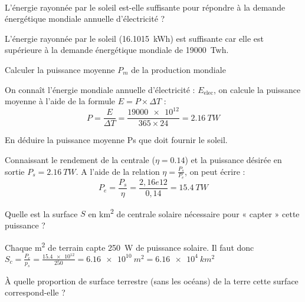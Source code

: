 \documentclass[10pt,fleqn]{article} %
\begin{document}
\begin{exercise}
~
    \begin{question}
        L’énergie rayonnée par le soleil est-elle suffisante pour répondre à la demande énergétique mondiale annuelle d'électricité ?
    \end{question}
    
    \begin{solution}
        L’énergie rayonnée par le soleil (\SI{16.1015}{kWh}) est suffisante car elle est supérieure à la demande énergétique mondiale de \SI{19000}{Twh}.
    \end{solution}
    
    
    \begin{question}
        Calculer la puissance moyenne $P_m$ de la production mondiale
    \end{question}
    \begin{solution}
        On connaît l'énergie mondiale annuelle d'électricité : $E_\text{elec}$, on calcule la puissance moyenne à l'aide de la formule $E=P\times \Delta T$ : $$P = \frac{E}{\Delta T} = \frac{\num{19000e12}}{365\times 24} = \SI{2,16}{TW}$$
    \end{solution}
    \begin{question}
        En déduire la puissance moyenne Ps que doit fournir le soleil.
    \end{question}
    \begin{solution}
        Connaissant le rendement de la centrale ($\eta=\num{0,14}$) et la puissance désirée en sortie $P_s = \SI{2,16}{TW}$. A l'aide de la relation $\eta = \frac{P_s}{P_e}$, on peut écrire : 
        $$P_e = \frac{P_s}{\eta} = \frac{2,16e12}{0,14} = \SI{15,4}{TW}$$
    \end{solution}
    \begin{question}
        Quelle est la surface $S$ en \si{km^2} de centrale solaire nécessaire pour « capter » cette puissance ?
    \end{question}
    \begin{solution}
        Chaque \si{m^2} de terrain capte \SI{250}{W} de puissance solaire. Il faut donc $S_c = \frac{P_e}{p_s} = \frac{\num{15,4e12}}{250} = \SI{6,16e10}{m^2} = \SI{6,16e4}{km^2}$
    \end{solution}
    \begin{question}
        À quelle proportion de surface terrestre (sans les océans) de la terre cette surface correspond-elle ? 
    \end{question}
    \begin{solution}

\end{solution}
\end{exercise}
\end{document}
